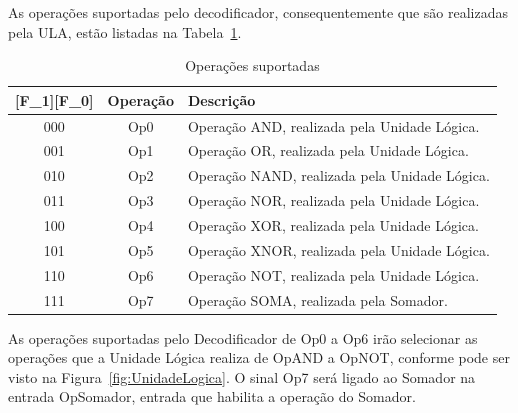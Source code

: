\documentclass[a4paper,10pt]{report}
\begin{document}
As operações suportadas pelo decodificador, consequentemente que são realizadas pela ULA, estão listadas na Tabela~\ref{tab:decod_operacoes}.

\begin{table}[H]
\centering
\caption{Operações suportadas} %
\begin{tabular}{ccl} %
\hline %
[F\_2][F\_1][F\_0] & Operação & Descrição \\ %
\hline
\hline
000 & Op0 & Operação AND, realizada pela Unidade Lógica. \\
001 & Op1 & Operação OR, realizada pela Unidade Lógica.  \\
010 & Op2 & Operação NAND, realizada pela Unidade Lógica. \\
011 & Op3 & Operação NOR, realizada pela Unidade Lógica.  \\
100 & Op4 & Operação XOR, realizada pela Unidade Lógica.  \\
101 & Op5 & Operação XNOR, realizada pela Unidade Lógica. \\
110 & Op6 & Operação NOT, realizada pela Unidade Lógica.  \\
111 & Op7 & Operação SOMA, realizada pela Somador. \\
\hline
\end{tabular}
\label{tab:decod_operacoes}
\end{table}

As operações suportadas pelo Decodificador de Op0 a Op6 irão selecionar as operações que a Unidade Lógica realiza de OpAND a OpNOT, conforme pode ser visto na Figura~\ref{fig:UnidadeLogica}. O sinal Op7 será ligado ao Somador na entrada OpSomador, entrada que habilita a operação do Somador.
\end{document}
